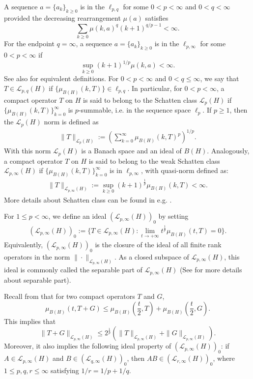 \documentclass[12pt]{amsart}
\begin{document}
A sequence $a=\{a_k\}_{k\geq0}$ is in the $\ell_{p,q}$ for some $0<p<\infty$ and $0<q<\infty$ provided the decreasing rearrangement $\mu(a)$ satisfies
$$\sum_{k\geq0 }\mu(k,a)^q(k+1)^{q/p-1}<\infty.$$
For the endpoint $q=\infty$, a sequence $a=\{a_k\}_{k\geq0}$ is in the $\ell_{p,\infty}$ for some $0<p<\infty$ if
$$\sup_{k\geq0}(k+1)^{1/p}\mu(k,a)<\infty.$$
See also \cite[Proposition 1.4.9]{MR3243734} for equivalent definitions. For $0<p<\infty$ and $0<q\leq \infty$, we say that $T\in \mathcal{L}_{p,q}(H)$ if $\{\mu_{B(H)}(k,T)\}\in \ell_{p,q}$. In particular, for $0<p<\infty$, a compact operator $T$ on $H$ is said to belong to the Schatten class $\mathcal{L}_{p}(H)$ if $\{\mu_{B(H)}(k,T)\}_{k=0}^{\infty}$ is $p$-summable, i.e. in the sequence space $\ell_{p}$. If $p\geq 1$, then the $\mathcal{L}_{p}(H)$ norm is defined as
\begin{align*}
\|T\|_{\mathcal{L}_{p}(H)}:=\left(\sum_{k=0}^{\infty}\mu_{B(H)}(k,T)^{p}\right)^{1/p}.
\end{align*}
With this norm $\mathcal{L}_p(H)$ is a Banach space and an ideal of $B(H)$. Analogously, a compact operator $T$ on $H$ is said to belong to the weak Schatten class  $\mathcal{L}_{p,\infty}(H)$ if $\{\mu_{B(H)}(k,T)\}_{k=0}^{\infty}$ is in $\ell_{p,\infty}$, with quasi-norm defined as:
\begin{align*}
\|T\|_{\mathcal{L}_{p,\infty}(H)}:=\sup\limits_{k\geq 0}(k+1)^{\frac 1p}\mu_{B(H)}(k,T)<\infty.
\end{align*}
More details about Schatten class can be found in e.g. \cite{LSZold,LSZ1}.

For $1\leq p <\infty$, we define an ideal $(\mathcal{L}_{p,\infty}(H))_{0}$ by setting
\begin{align*}
(\mathcal{L}_{p,\infty}(H))_{0}:=\{T \in \mathcal{L}_{p,\infty}(H)   :  \lim_{t\to +\infty} t^{\frac 1p} \mu_{B(H)}(t,T) = 0 \}.
\end{align*}
Equivalently, $(\mathcal{L}_{p,\infty}(H))_{0}$ is the closure of the ideal of all finite rank operators in the norm $\|\cdot\|_{\mathcal{L}_{p,\infty}(H)}$.
As a closed subspace of $\mathcal{L}_{p,\infty}(H)$, this ideal is commonly called the separable part of $\mathcal{L}_{p,\infty}(H)$ (See \cite{LSZold,LSZ1} for more details about separable part).

Recall from \cite[Corollary 2.3.16]{LSZold} that for two compact operators $T$ and $G$,
$$\mu_{B(H)}(t,T+G)\leq \mu_{B(H)}(\frac t2,T)+\mu_{B(H)}(\frac t2,G).$$
This implies that
$$\|T+G\|_{\mathcal{L}_{p,\infty}(H)}\leq 2^{\frac1p}(\|T\|_{\mathcal{L}_{p,\infty}(H)}+\|G\|_{\mathcal{L}_{p,\infty}(H)}).$$
Moreover, it also implies the following ideal property of $(\mathcal{L}_{p,\infty}(H))_0$: if $A\in \mathcal{L}_{p,\infty}(H)$ and $B\in (\mathcal{L}_{q,\infty}(H))_0$, then $AB\in (\mathcal{L}_{r,\infty}(H))_{0}$, where $1\leq p,q,r\leq\infty$ satisfying $1/r=1/p+1/q$.
\end{document}
